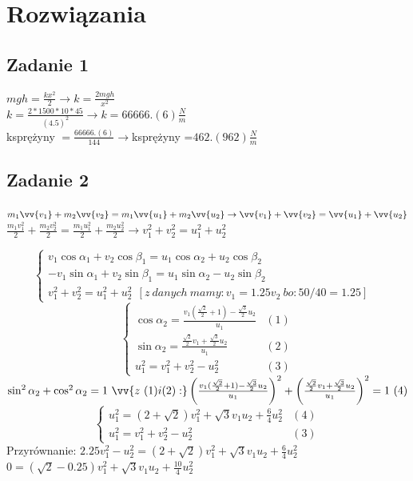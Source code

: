 \documentclass[14pt]{extarticle}
\begin{document}
    \section{Rozwiązania}
    \subsection{Zadanie 1}
    \Large
        \(mgh=\frac{kx^2}{2} \rightarrow k=\frac{2mgh}{x^2}\)\\
        \(k=\frac{2\ast 1500 \ast 10\ast 45}{(4.5)^2} \rightarrow k=66666.(6)\frac{N}{m}\)\\
        k\footnotesize sprężyny \Large\(=\frac{66666.(6)}{144} \rightarrow\)k\footnotesize sprężyny \LARGE=\underline{\(462.(962)\frac{N}{m}\)}
    \subsection{Zadanie 2}
    \large
    $m_1\vv{v_1}+m_2\vv{v_2}=m_1\vv{u_1}+m_2\vv{u_2} \rightarrow \vv{v_1} + \vv{v_2} = \vv{u_1} + \vv{u_2}$\\
    $\frac{m_1v_1^2}{2}+\frac{m_2v_2^2}{2}=\frac{m_1u_1^2}{2}+\frac{m_2u_2^2}{2} \rightarrow v_1^2 + v_2^2 = u_1^2 + u_2^2 $
    
    \begin{equation*}
        \begin{cases}
           v_1\cos\alpha _1 + v_2\cos\beta _1 = u_1\cos\alpha _2 + u_2\cos\beta _2 &\\
            -v_1\sin\alpha _1 + v_2\sin\beta _1 = u_1\sin\alpha _2 - u_2\sin\beta _2 &\\
           v_1^2 + v_2^2 = u_1^2 + u_2^2 \ \ [z \ danych \ mamy:v_1=1.25v_2 \ bo: 50/40=1.25] &
        \end{cases}
    \end{equation*}
    \begin{equation*}
        \begin{cases}
            \cos\alpha _2 = \frac{v_1(\frac{\sqrt{2}}{2}+1)-\frac{\sqrt{3}}{2}u_2}{u_1}&(1)\\
            \sin\alpha _2 = \frac{\frac{\sqrt{2}}{2}v_1+\frac{\sqrt{3}}{2}u_2}{u_1}&(2)\\
            u_1^2 = v_1^2 + v_2^2 - u_2^2&(3)
        \end{cases}
    \end{equation*}
    $\sin^2\alpha _2 + \cos^2\alpha _2 = 1\ \vv{z \ (1)i(2):}
    \left(\frac{v_1(\frac{\sqrt{2}}{2}+1)-\frac{\sqrt{3}}{2}u_2}{u_1}\right)^2 + \left(\frac{\frac{\sqrt{2}}{2}v_1+\frac{\sqrt{3}}{2}u_2}{u_1}\right)^2 = 1 \ (4)$
    \begin{equation*}
        \begin{cases}
            u_1^2 = (2+\sqrt{2})v_1^2 + \sqrt{3}v_1u_2 + \frac{6}{4} u_2^2&(4)\\
            u_1^2 = v_1^2 + v_2^2 - u_2^2&(3)
        \end{cases}
    \end{equation*}
        Przyrównanie: $2.25v_1^2 - u_2^2=(2+\sqrt{2})v_1^2 + \sqrt{3}v_1u_2 + \frac{6}{4} u_2^2$\\
        $ 0=(\sqrt{2}-0.25)v_1^2+\sqrt{3}v_1u_2+\frac{10}{4}u_2^2$\\

        
            
\end{document}
